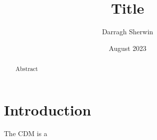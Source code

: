 \documentclass[12pt, a4paper]{article}
\title{Title}
\author{Darragh Sherwin}
\date{August 2023}
\begin{document}
\maketitle
\begin{abstract}
Abstract

\end{abstract}

\section{Introduction}

The \Lambda CDM is a 

\printbibliography
\end{document}
